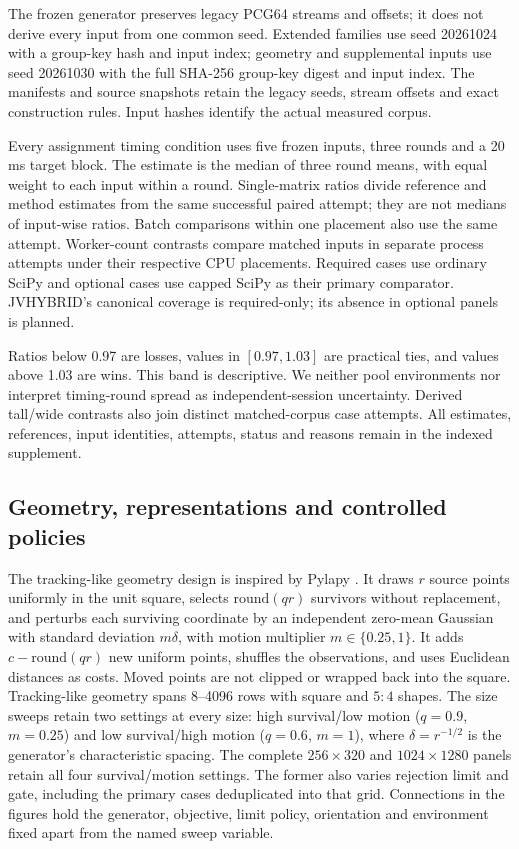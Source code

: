 \documentclass[11pt,a4paper]{article}
\begin{document}
The frozen generator preserves legacy PCG64 streams and offsets; it does not derive every input from one common seed. Extended families use seed 20261024 with a group-key hash and input index; geometry and supplemental inputs use seed 20261030 with the full SHA-256 group-key digest and input index. The manifests and source snapshots retain the legacy seeds, stream offsets and exact construction rules. Input hashes identify the actual measured corpus.

Every assignment timing condition uses five frozen inputs, three rounds and a 20 ms target block. The estimate is the median of three round means, with equal weight to each input within a round. Single-matrix ratios divide reference and method estimates from the same successful paired attempt; they are not medians of input-wise ratios. Batch comparisons within one placement also use the same attempt. Worker-count contrasts compare matched inputs in separate process attempts under their respective CPU placements. Required cases use ordinary SciPy and optional cases use capped SciPy as their primary comparator. JVHYBRID's canonical coverage is required-only; its absence in optional panels is planned.

Ratios below 0.97 are losses, values in $[0.97,1.03]$ are practical ties, and values above 1.03 are wins. This band is descriptive. We neither pool environments nor interpret timing-round spread as independent-session uncertainty. Derived tall/wide contrasts also join distinct matched-corpus case attempts. All estimates, references, input identities, attempts, status and reasons remain in the indexed supplement.

\subsection{Geometry, representations and controlled policies}

The tracking-like geometry design is inspired by Pylapy \cite{pylapy2026}. It draws $r$ source points uniformly in the unit square, selects $\mathrm{round}(qr)$ survivors without replacement, and perturbs each surviving coordinate by an independent zero-mean Gaussian with standard deviation $m\delta$, with motion multiplier $m\in\{0.25,1\}$. It adds $c-\mathrm{round}(qr)$ new uniform points, shuffles the observations, and uses Euclidean distances as costs. Moved points are not clipped or wrapped back into the square. Tracking-like geometry spans 8--4096 rows with square and $5:4$ shapes. The size sweeps retain two settings at every size: high survival/low motion ($q=0.9$, $m=0.25$) and low survival/high motion ($q=0.6$, $m=1$), where $\delta=r^{-1/2}$ is the generator's characteristic spacing. The complete $256\times320$ and $1024\times1280$ panels retain all four survival/motion settings. The former also varies rejection limit and gate, including the primary cases deduplicated into that grid. Connections in the figures hold the generator, objective, limit policy, orientation and environment fixed apart from the named sweep variable.
\end{document}
